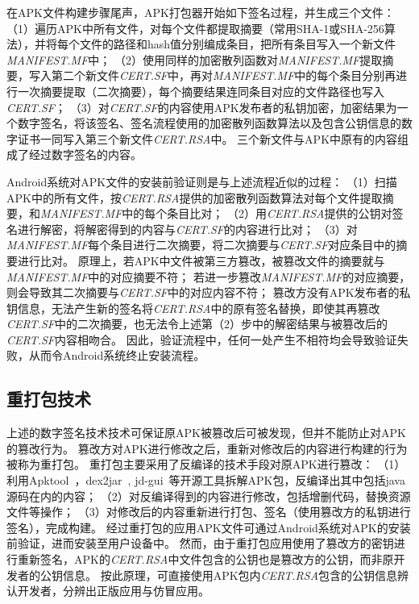 在APK文件构建步骤尾声，APK打包器开始如下签名过程，并生成三个文件：
（1）遍历APK中所有文件，对每个文件都提取摘要（常用SHA-1或SHA-256算法），并将每个文件的路径和hash值分别编成条目，把所有条目写入一个新文件\textit{MANIFEST.MF}中；
（2）使用同样的加密散列函数对\textit{MANIFEST.MF}提取摘要，写入第二个新文件\textit{CERT.SF}中，再对\textit{MANIFEST.MF}中的每个条目分别再进行一次摘要提取（二次摘要），每个摘要结果连同条目对应的文件路径也写入\textit{CERT.SF}；
（3）对\textit{CERT.SF}的内容使用APK发布者的私钥加密，加密结果为一个数字签名，将该签名、签名流程使用的加密散列函数算法以及包含公钥信息的数字证书一同写入第三个新文件\textit{CERT.RSA}中。
三个新文件与APK中原有的内容组成了经过数字签名的内容。

Android系统对APK文件的安装前验证则是与上述流程近似的过程：
（1）扫描APK中的所有文件，按\textit{CERT.RSA}提供的加密散列函数算法对每个文件提取摘要，和\textit{MANIFEST.MF}中的每个条目比对；
（2）用\textit{CERT.RSA}提供的公钥对签名进行解密，将解密得到的内容与\textit{CERT.SF}的内容进行比对；
（3）对\textit{MANIFEST.MF}每个条目进行二次摘要，将二次摘要与\textit{CERT.SF}对应条目中的摘要进行比对。
原理上，若APK中文件被第三方篡改，被篡改文件的摘要就与\textit{MANIFEST.MF}中的对应摘要不符；
若进一步篡改\textit{MANIFEST.MF}的对应摘要，则会导致其二次摘要与\textit{CERT.SF}中的对应内容不符；
篡改方没有APK发布者的私钥信息，无法产生新的签名将\textit{CERT.RSA}中的原有签名替换，即使其再篡改\textit{CERT.SF}中的二次摘要，也无法令上述第（2）步中的解密结果与被篡改后的\textit{CERT.SF}内容相吻合。
因此，验证流程中，任何一处产生不相符均会导致验证失败，从而令Android系统终止安装流程。

\subsection{重打包技术}
\label{sec:repackaging}

上述的数字签名技术技术可保证原APK被篡改后可被发现，但并不能防止对APK的篡改行为。
篡改方对APK进行修改之后，重新对修改后的内容进行构建的行为被称为重打包。
重打包主要采用了反编译的技术手段对原APK进行篡改：
（1）利用Apktool~\cite{apktool}，dex2jar~\cite{dex2jar}, jd-gui~\cite{jd-gui}等开源工具拆解APK包，反编译出其中包括java源码在内的内容；
（2）对反编译得到的内容进行修改，包括增删代码，替换资源文件等操作；
（3）对修改后的内容重新进行打包、签名（使用篡改方的私钥进行签名），完成构建。
经过重打包的应用APK文件可通过Android系统对APK的安装前验证，进而安装至用户设备中。
然而，由于重打包应用使用了篡改方的密钥进行重新签名，APK的\textit{CERT.RSA}中文件包含的公钥也是篡改方的公钥，而非原开发者的公钥信息。
按此原理，可直接使用APK包内\textit{CERT.RSA}包含的公钥信息辨认开发者，分辨出正版应用与仿冒应用。

